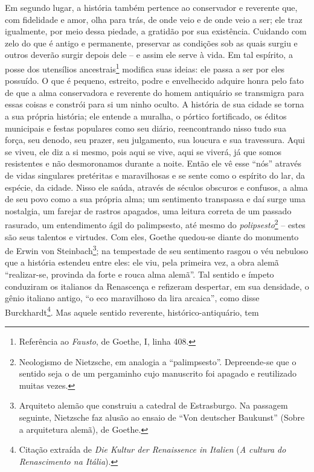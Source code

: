 Em segundo lugar, a história também pertence ao conservador e reverente que, 
com fidelidade e amor, olha para trás, de onde veio e de
onde veio a ser; ele traz igualmente, por meio dessa piedade, a gratidão
por sua existência. Cuidando com zelo do que é antigo e permanente, preservar
 as condições sob as quais surgiu e outros deverão
surgir depois dele -- e assim ele serve à vida. Em tal espírito, a posse
dos utensílios ancestrais\footnote{Referência ao \emph{Fausto}, de
  Goethe, I, linha 408.} modifica suas ideias: ele passa a ser por eles
possuído. O que é pequeno, estreito, podre e envelhecido adquire honra
pelo fato de que a alma conservadora e reverente do homem antiquário se
transmigra para essas coisas e constrói para si um ninho oculto. A
história de sua cidade se torna a sua própria história; ele entende a
muralha, o pórtico fortificado, os éditos municipais e festas populares
como seu diário, reencontrando nisso tudo sua força, seu denodo, seu
prazer, seu julgamento, sua loucura e sua travessura. Aqui se viveu, ele
diz a si mesmo, pois aqui se vive, aqui se viverá, já que somos
resistentes e não desmoronamos durante a noite. Então ele vê esse
``nós'' através de vidas singulares pretéritas e maravilhosas e se sente
como o espírito do lar, da espécie, da cidade. Nisso ele saúda, através
de séculos obscuros e confusos, a alma de seu povo como a sua própria
alma; um sentimento transpassa e daí surge uma nostalgia, um farejar de
rastros apagados, uma leitura correta de um passado rasurado, um
entendimento ágil do palimpsesto, até mesmo do \emph{polipsesto}\footnote{Neologismo
  de Nietzsche, em analogia a ``palimpsesto''. Depreende-se que o
  sentido seja o de um pergaminho cujo manuscrito foi apagado e
  reutilizado muitas vezes.} -- estes são seus talentos e virtudes. Com
eles, Goethe quedou-se diante do monumento de Erwin von
Steinbach\footnote{Arquiteto alemão que construiu a catedral de
  Estrasburgo. Na passagem seguinte, Nietzsche faz alusão ao ensaio de
  ``Von deutscher Baukunst'' (Sobre a arquitetura alemã), de Goethe.};
na tempestade de seu sentimento rasgou o véu nebuloso que a história
estendeu entre eles: ele viu, pela primeira vez, a obra alemã
``realizar-se, provinda da forte e rouca alma alemã''. Tal sentido e
ímpeto conduziram os italianos da Renascença e refizeram despertar, em
sua densidade, o gênio italiano antigo, ``o eco maravilhoso da lira
arcaica'', como disse Burckhardt\footnote{Citação extraída de \emph{Die
  Kultur der Renaissence in Italien} (\emph{A cultura do Renascimento na
  Itália}).}. Mas aquele sentido reverente, histórico-antiquário, tem
